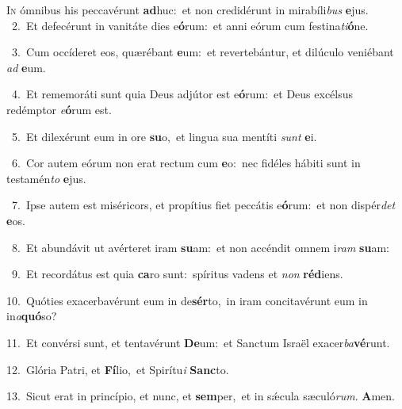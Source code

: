\lettrine{\initial\textcolor{\initialcolor}{I}}{n} ómnibus his peccavérunt \textbf{ad}\-huc:~\star et non credidérunt in mirabíli\textit{bus} \textbf{e}\-jus.\\
{\numbfont\textcolor{\numbcolor}{~2.}}~Et defecérunt in vanitáte dies e\-\textbf{ó}\-rum:~\star et anni eórum cum festina\-\textit{ti}\-\textbf{ó}ne.\par
{\numbfont\textcolor{\numbcolor}{~3.}}~Cum occíderet eos, quærébant \textbf{e}\-um:~\star et revertebántur, et dilúculo veniébant \textit{ad} \textbf{e}\-um.\par
{\numbfont\textcolor{\numbcolor}{~4.}}~Et rememoráti sunt quia Deus adjútor est e\-\textbf{ó}\-rum:~\star et Deus excélsus redémptor \textit{e}\-\textbf{ó}rum est.\par
{\numbfont\textcolor{\numbcolor}{~5.}}~Et dilexérunt eum in ore \textbf{su}\-o,~\star et lingua sua mentíti \textit{sunt} \textbf{e}\-i.\par
{\numbfont\textcolor{\numbcolor}{~6.}}~Cor autem eórum non erat rectum cum \textbf{e}\-o:~\star nec fidéles hábiti sunt in testamén\textit{to} \textbf{e}\-jus.\par
{\numbfont\textcolor{\numbcolor}{~7.}}~Ipse autem est miséricors, et propítius fiet peccátis e\-\textbf{ó}\-rum:~\star et non dispér\textit{det} \textbf{e}\-os.\par
{\numbfont\textcolor{\numbcolor}{~8.}}~Et abundávit ut avérteret iram \textbf{su}\-am:~\star et non accéndit omnem i\textit{ram} \textbf{su}\-am:\par
{\numbfont\textcolor{\numbcolor}{~9.}}~Et recordátus est quia \textbf{ca}\-ro sunt:~\star spíritus vadens et \textit{non} \textbf{réd}\-iens.\par
{\numbfont\textcolor{\numbcolor}{10.}}~Quóties exacerbavérunt eum in de\-\textbf{sér}\-to,~\star in iram concitavérunt eum in in\-\textit{a}\-\textbf{quó}so?\par
{\numbfont\textcolor{\numbcolor}{11.}}~Et convérsi sunt, et tentavérunt \textbf{De}\-um:~\star et Sanctum Israël exacer\-\textit{ba}\-\textbf{vé}runt.\par
{\numbfont\textcolor{\numbcolor}{12.}}~Glória Patri, et \textbf{Fí}\-lio,~\star et Spirítu\textit{i} \textbf{Sanc}\-to.\par
{\numbfont\textcolor{\numbcolor}{13.}}~Sicut erat in princípio, et nunc, et \textbf{sem}\-per,~\star et in sǽcula sæculó\-\textit{rum}\-. \textbf{A}\-men.\par
